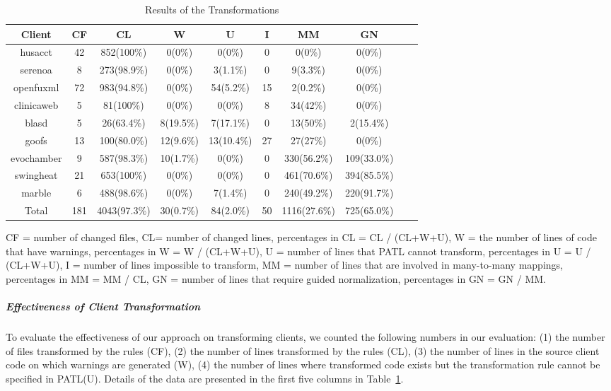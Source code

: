 \documentclass[a4paper, USenglish]{lipics-v2016}
\newcommand{\PATL}{PATL\xspace}
\theoremstyle{plain}
\begin{document}
\begin{table}
  \centering
  \caption{Results of the Transformations}
  \label{tbl:results}
  \footnotesize
  \begin{tabular}{|c|c|c|c|c|c|c|c|c|c|}
    \hline
    Client & CF & CL & W & U & I & MM & GN\\
    \hline \hline
    husacct     & 42 & 852(100\%) & 0(0\%) & 0(0\%)& 0 & 0(0\%) & 0(0\%)\\
    \hline
    serenoa     & 8 & 273(98.9\%) & 0(0\%) &3(1.1\%)& 0 & 9(3.3\%)& 0(0\%)\\
    \hline
    openfuxml   & 72 & 983(94.8\%) & 0(0\%) &54(5.2\%) &  15  & 2(0.2\%) & 0(0\%)\\
    \hline
    clinicaweb  & 5 & 81(100\%) & 0(0\%) &0(0\%) & 8  & 34(42\%)& 0(0\%)\\
    \hline
    blasd      & 5 & 26(63.4\%) & 8(19.5\%) &7(17.1\%) &0  & 13(50\%) &2(15.4\%)\\
    \hline
    goofs      & 13 & 100(80.0\%) & 12(9.6\%) & 13(10.4\%)  & 27  & 27(27\%) & 0(0\%)\\
    \hline
    evochamber & 9 & 587(98.3\%) & 10(1.7\%) & 0(0\%) & 0  & 330(56.2\%)& 109(33.0\%)\\
    \hline
    swingheat & 21 & 653(100\%) & 0(0\%) & 0(0\%) & 0 & 461(70.6\%) & 394(85.5\%)\\
    \hline
    marble & 6 & 488(98.6\%) & 0(0\%) & 7(1.4\%) & 0  & 240(49.2\%) & 220(91.7\%)\\
    \hline    
    \hline
    Total & 181 & 4043(97.3\%) & 30(0.7\%) & 84(2.0\%) & 50 & 1116(27.6\%) & 725(65.0\%)\\ 
    \hline
  \end{tabular}
  \parbox{\columnwidth}{
    CF = number of changed files, CL= number of changed lines,
    percentages in CL = CL / (CL+W+U), W = the number of lines of code
    that have warnings, percentages in W = W / (CL+W+U), U = number of lines that
    \PATL cannot transform, 
    percentages in U = U / (CL+W+U), I =
    number of lines impossible to transform, 
    MM = number of lines that are involved in many-to-many mappings,
    percentages in MM = MM / CL, GN = number of lines that require
    guided normalization, percentages in GN = GN / MM.}
\vspace{-5pt}
\end{table}

\subparagraph*{Effectiveness of Client Transformation}
To evaluate the effectiveness of our approach on transforming clients,
we counted the following numbers in our evaluation: (1) the number of
files transformed by the rules (CF), (2) the number of lines transformed by
the rules (CL), (3) the number of lines in the source client code on which
warnings are generated (W), (4) the number of lines where transformed code
exists but the transformation rule cannot be specified in \PATL (U).
Details of the data are presented in the first five columns in Table~\ref{tbl:results}.
\end{document}
